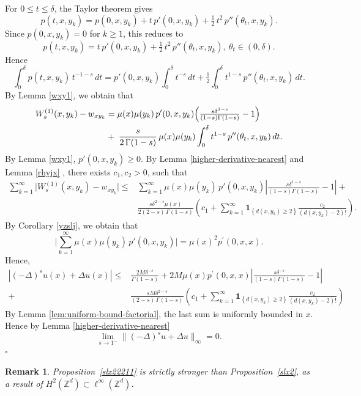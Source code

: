 \documentclass[reqno,12pt]{amsart}
\numberwithin{equation}{section}
\newtheorem{remark}[theorem]{Remark}
\begin{document}
	For \(0\le t\le \delta\), the Taylor theorem gives
	\[
	p(t,x,y_k)
	= p(0,x,y_k) + t\,p'(0,x,y_k) + \tfrac12\,t^2\,p''(\theta_t,x,y_k).
	\]
	Since \(p(0,x,y_k)=0\) for \(k\ge1\), this reduces to
	\[
	p(t,x,y_k)
	= t\,p'(0,x,y_k) + \tfrac12\,t^2\,p''(\theta_t,x,y_k),\:\theta_t\in (0,\delta).
	\]
	Hence
	\[
	\int_0^\delta p(t,x,y_k)\,t^{-1-s}\,dt
	= p'(0,x,y_k)\int_0^\delta t^{-s}\,dt
	+ \tfrac12\int_0^\delta t^{1-s}\,p''(\theta_t,x,y_k)\,dt.
	\]
	By Lemma \ref{wxy1}, we obtain that
	\[
	\begin{aligned}
		W_s^{(1)}(x,y_k)-w_{xy_k}&
		=\mu(x)\mu(y_k)\,p'(0,x,y_k)\Bigl(\tfrac{s\delta^{1-s}}{(1-s)\Gamma(1-s)}-1\Bigr)
		\\&+\;\frac{s}{2\,\Gamma(1-s)}\,\mu(x)\mu(y_k)
		\int_0^\delta t^{1-s}\,p''(\theta_t,x,y_k)\,dt.
	\end{aligned}
	\]
	By Lemma \ref{wxy1}, $p'(0,x,y_k)\ge 0.$ By Lemma \ref{higher‐derivative-nearest} and Lemma \ref{rhyjx} , there exists $c_1,c_2>0$, such that
	\[\begin{aligned}
		\sum_{k=1}^\infty\bigl|W_s^{(1)}(x,y_k)-w_{xy_k}\bigr|\le &\sum_{k=1}^\infty \mu(x)\mu(y_k)\,p'(0,x,y_k)\left|\tfrac{s\delta^{1-s}}{(1-s)\Gamma(1-s)}-1\right|+\\&\frac{s\delta^{2-s}\mu(x)}{2\left(2-s\right)\,\Gamma(1-s)}\left(c_1+\sum_{k=1}^\infty \mathbf{1}_{\left\{d\left(x,y_k\right)\ge 2\right\}}
		\frac{c_2}{\left(d(x,y_k)-2\right)!}\right).
	\end{aligned}\]
	By Corollary \ref{yzslj}, we obtain that
	\[\bigl|\sum_{k=1}^\infty \mu(x)\mu(y_k)\,p'(0,x,y_{k})\bigr|=\mu(x)^{2}p^{\prime}\left(0,x,x\right).\]
	Hence,
	\[\begin{aligned}
		\left| (-\Delta)^s u(x) + \Delta u(x) \right| \leq&  \frac{2M\delta^{-s}}{\Gamma(1-s)}+2M\mu(x)p^{\prime}(0,x,x)\left|\tfrac{s\delta^{-s}}{(1-s)\Gamma(1-s)}-1\right|\\+&\frac{sM\delta^{2-s}}{\left(2-s\right)\,\Gamma(1-s)}\left(c_1+\sum_{k=1}^\infty \mathbf{1}_{\left\{d\left(x,y_k\right)\ge 2\right\}}
		\frac{c_2}{\left(d(x,y_k)-2\right)!}\right)
	\end{aligned}
	\]
	By Lemma \ref{lem:uniform‐bound‐factorial}, the last sum is uniformly bounded in \(x\).  Hence by Lemma \ref{higher‐derivative-nearest}
	\[
	\lim_{s\to1^-}\bigl\|(-\Delta)^s u + \Delta u\bigr\|_\infty = 0.
	\]
\hfill $\square$

\begin{remark}
	 Proposition~\ref{slx22211} is strictly stronger than Proposition~\ref{slx2}, as a result of \(H^2(\mathbb{Z}^d)\subset \ell^\infty(\mathbb{Z}^d)\).
\end{remark}
\end{document}
